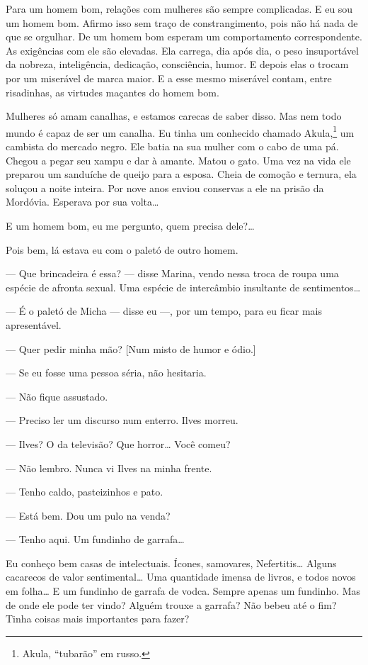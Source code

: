 Para um homem bom, relações com mulheres são sempre complicadas. E eu
sou um homem bom. Afirmo isso sem traço de constrangimento, pois não há
nada de que se orgulhar. De um homem bom esperam um comportamento
correspondente. As exigências com ele são elevadas. Ela carrega, dia
após dia, o peso insuportável da nobreza, inteligência, dedicação,
consciência, humor. E depois elas o trocam por um miserável de marca
maior. E a esse mesmo miserável contam, entre risadinhas, as virtudes
maçantes do homem bom.

Mulheres só amam canalhas, e estamos carecas de saber disso. Mas nem
todo mundo é capaz de ser um canalha. Eu tinha um conhecido chamado
Akula,\footnote{Akula, ``tubarão'' em russo.} um cambista do mercado
negro. Ele batia na sua mulher com o cabo de uma pá. Chegou a pegar seu
xampu e dar à amante. Matou o gato. Uma vez na vida ele preparou um
sanduíche de queijo para a esposa. Cheia de comoção e ternura, ela
soluçou a noite inteira. Por nove anos enviou conservas a ele na prisão
da Mordóvia. Esperava por sua volta\ldots{}

E um homem bom, eu me pergunto, quem precisa dele?\ldots{}

Pois bem, lá estava eu com o paletó de outro homem.

--- Que brincadeira é essa? --- disse Marina, vendo nessa troca de roupa
uma espécie de afronta sexual. Uma espécie de intercâmbio insultante de
sentimentos\ldots{}

--- É o paletó de Micha --- disse eu ---, por um tempo, para eu ficar
mais apresentável.

--- Quer pedir minha mão? {[}Num misto de humor e ódio.{]}

--- Se eu fosse uma pessoa séria, não hesitaria.

--- Não fique assustado.

--- Preciso ler um discurso num enterro. Ilves morreu.

--- Ilves? O da televisão? Que horror\ldots{} Você comeu?

--- Não lembro. Nunca vi Ilves na minha frente.

--- Tenho caldo, pasteizinhos e pato.

--- Está bem. Dou um pulo na venda?

--- Tenho aqui. Um fundinho de garrafa\ldots{}

Eu conheço bem casas de intelectuais. Ícones, samovares, Nefertitis\ldots{}
Alguns cacarecos de valor sentimental\ldots{} Uma quantidade imensa de
livros, e todos novos em folha\ldots{} E um fundinho de garrafa de vodca.
Sempre apenas um fundinho. Mas de onde ele pode ter vindo? Alguém trouxe
a garrafa? Não bebeu até o fim? Tinha coisas mais importantes para
fazer?

